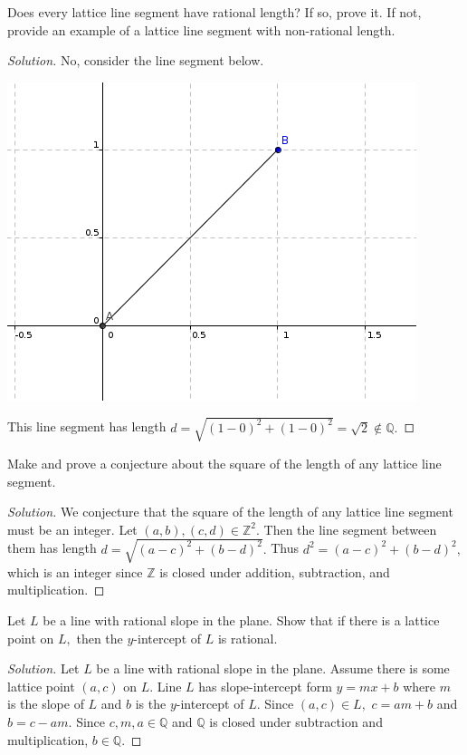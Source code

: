 \documentclass[12pt]{article}
\newcommand{\Z}{\mathbb{Z}}
\newcommand{\Q}{\mathbb{Q}}
\newenvironment{exercise}[2][Exercise]{\begin{trivlist}
        \item[\hskip \labelsep {\bfseries #1}\hskip \labelsep {\bfseries #2.}]}{\end{trivlist}}
\newenvironment{solution}
        {\begin{proof}[Solution]}
                    {\end{proof}}
\begin{document}
\begin{exercise}{21}
    Does every lattice line segment have rational length? If so, prove it. If not, provide an example of a lattice line segment with non-rational length.
    \begin{solution}
        No, consider the line segment below.
        \begin{center}
            \includegraphics[width=.45\linewidth]{21}
        \end{center}
        This line segment has length \( d = \sqrt{(1-0)^{2} + ( 1 - 0 )^{2} } = \sqrt{2} \notin \Q.  \)
    \end{solution}
\end{exercise}

\begin{exercise}{22}
    Make and prove a conjecture about the square of the length of any lattice line segment.
    \begin{solution}
        We conjecture that the square of the length of any lattice line segment must be an integer. Let \( ( a,b ) , ( c,d ) \in \Z^{2} . \) Then the line segment between them has length \( d = \sqrt{( a - c )^{2} + ( b - d )^{2}} . \) Thus \( d^{2} = ( a -c )^{2} + ( b-d )^{2}, \) which is an integer since \( \Z \) is closed under addition, subtraction, and multiplication.
    \end{solution}
\end{exercise}

\begin{exercise}{23}
    Let \( L \) be a line with rational slope in the plane. Show that if there is a lattice point on \( L, \) then the \( y \)-intercept of \( L \) is rational.
    \begin{solution}
        Let \( L \) be a line with rational slope in the plane. Assume there is some lattice point \( (a,c) \) on \( L. \) Line \( L \) has slope-intercept form \( y = mx + b \) where \( m \) is the slope of \( L \) and \( b \) is the \( y \)-intercept of \( L. \) Since \( ( a,c ) \in L, \) \( c = am + b \) and \( b = c - am. \) Since \( c,m,a \in \Q \) and \( \Q \) is closed under subtraction and multiplication, \( b \in \Q. \)
    \end{solution}
\end{exercise}
\end{document}
